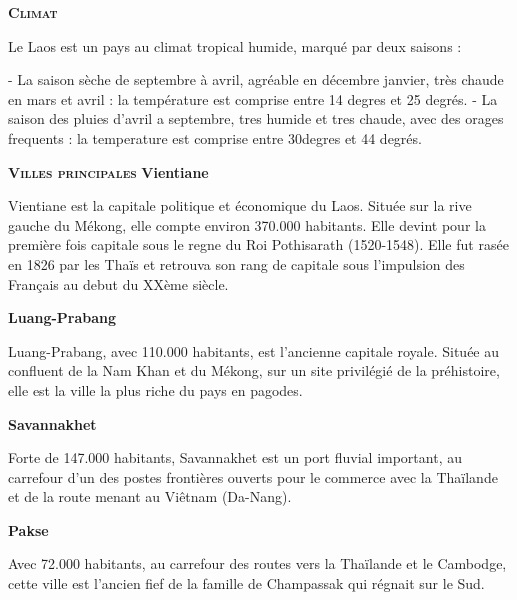\begin{multicols}{2}
\textbf{\textsc{Climat}}

Le Laos est un pays au climat tropical humide, marqué par deux saisons :

- La saison sèche de septembre à avril, agréable en décembre janvier, très chaude en mars et avril : la température est comprise entre 14 degres et 25 degrés.
- La saison des pluies d’avril a septembre, tres humide et tres chaude, avec des orages frequents : la temperature est comprise entre 30degres et 44 degrés.

\textbf{\textsc{Villes principales}}
\textbf{Vientiane}

Vientiane est la capitale politique et économique du Laos. Située sur la rive gauche du Mékong, elle compte environ 370.000 habitants. Elle devint pour la première fois capitale sous le regne du Roi Pothisarath (1520-1548). Elle fut rasée en 1826 par les Thaïs et retrouva son rang de capitale sous l’impulsion des Français au debut du XXème siècle.

\textbf{Luang-Prabang}

Luang-Prabang, avec 110.000 habitants, est l’ancienne capitale royale. Située au confluent de la Nam Khan et du Mékong, sur un site privilégié de la préhistoire, elle est la ville la plus riche du pays en pagodes.

\textbf{Savannakhet}

Forte de 147.000 habitants, Savannakhet est un port fluvial important, au carrefour d’un des postes frontières ouverts pour le commerce avec la Thaïlande et de la route menant au Viêtnam (Da-Nang).

\textbf{Pakse}

Avec 72.000 habitants, au carrefour des routes vers la Thaïlande et le Cambodge, cette ville est l’ancien fief de la famille de Champassak qui régnait sur le Sud.

\end{multicols}

\vfill
